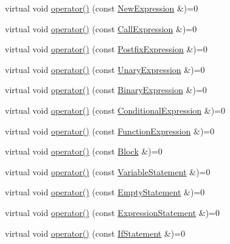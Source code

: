 \begin{DoxyCompactItemize}
\item 
virtual void \hyperlink{structast_1_1_visitor_a039e3f2d770d94a22721954f04b5b14a}{operator()} (const \hyperlink{structast_1_1_new_expression}{New\+Expression} \&)=0
\item 
virtual void \hyperlink{structast_1_1_visitor_af2f183fc759d390ec89bdb63e83ea5f4}{operator()} (const \hyperlink{structast_1_1_call_expression}{Call\+Expression} \&)=0
\item 
virtual void \hyperlink{structast_1_1_visitor_ab6cdff74b8ff070c52cc54576366f2e2}{operator()} (const \hyperlink{structast_1_1_postfix_expression}{Postfix\+Expression} \&)=0
\item 
virtual void \hyperlink{structast_1_1_visitor_a03a96c54ce87df9aee891127c1d5c224}{operator()} (const \hyperlink{structast_1_1_unary_expression}{Unary\+Expression} \&)=0
\item 
virtual void \hyperlink{structast_1_1_visitor_acbb550d612a89a7a972d55612007ff06}{operator()} (const \hyperlink{structast_1_1_binary_expression}{Binary\+Expression} \&)=0
\item 
virtual void \hyperlink{structast_1_1_visitor_a7e5f238fa18438f867b217344e99fad6}{operator()} (const \hyperlink{structast_1_1_conditional_expression}{Conditional\+Expression} \&)=0
\item 
virtual void \hyperlink{structast_1_1_visitor_aafbff9e6efd765ff7d9c27b4379eccfb}{operator()} (const \hyperlink{structast_1_1_function_expression}{Function\+Expression} \&)=0
\item 
virtual void \hyperlink{structast_1_1_visitor_a8e298310514ce2f7a097375211b9d5d1}{operator()} (const \hyperlink{structast_1_1_block}{Block} \&)=0
\item 
virtual void \hyperlink{structast_1_1_visitor_a376a191179fde4c78f79ad92ad400b8a}{operator()} (const \hyperlink{structast_1_1_variable_statement}{Variable\+Statement} \&)=0
\item 
virtual void \hyperlink{structast_1_1_visitor_a54a92adfd8ce6ebda7b9a83a9b0ca67f}{operator()} (const \hyperlink{structast_1_1_empty_statement}{Empty\+Statement} \&)=0
\item 
virtual void \hyperlink{structast_1_1_visitor_a387c7f00e658d64ea8e243b2520205bd}{operator()} (const \hyperlink{structast_1_1_expression_statement}{Expression\+Statement} \&)=0
\item 
virtual void \hyperlink{structast_1_1_visitor_a3d828aae86bc6fb6a489c9995ae10a4b}{operator()} (const \hyperlink{structast_1_1_if_statement}{If\+Statement} \&)=0
\item 

\end{DoxyCompactItemize}
